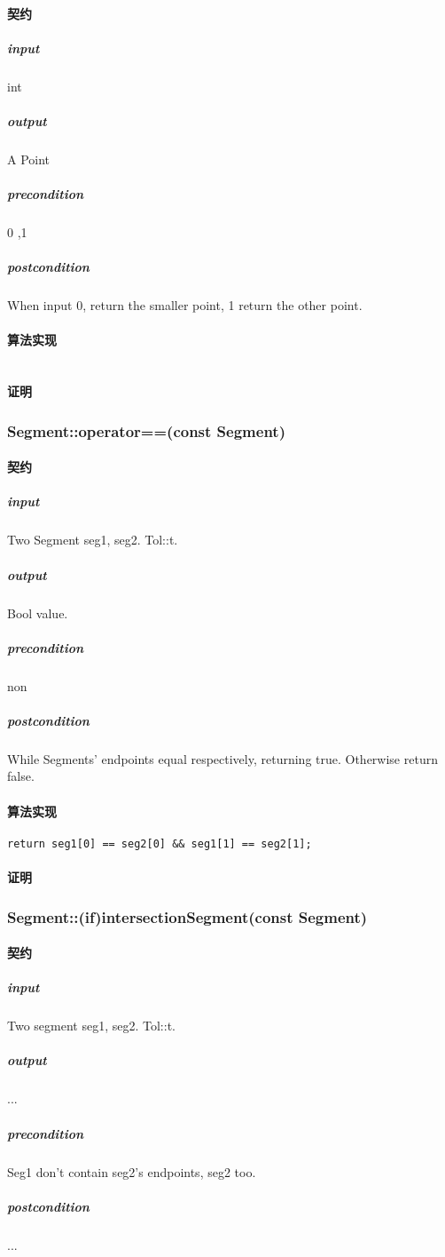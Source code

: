 \documentclass[a4paper]{book}
\numberwithin{equation}{chapter}
\theoremstyle{definition}
\begin{document}
\begin{multicols}{2}
\paragraph{契约}
\subparagraph{input}
int
\subparagraph{output}
A Point
\subparagraph{precondition}
0 ,1
\subparagraph{postcondition}
When input 0, return the smaller point, 1 return  the other point. 
\paragraph{算法实现}
\begin{lstlisting}

\end{lstlisting}
\paragraph{证明}

\subsubsection{Segment::operator==(const Segment)}
\paragraph{契约}
\subparagraph{input}
Two Segment seg1, seg2. Tol::t.
\subparagraph{output}
Bool value.
\subparagraph{precondition}
non
\subparagraph{postcondition}
While Segments' endpoints equal respectively, returning true. Otherwise return false.
\paragraph{算法实现}
\begin{lstlisting}
return seg1[0] == seg2[0] && seg1[1] == seg2[1];
\end{lstlisting}
\paragraph{证明}

\subsubsection{Segment::(if)intersectionSegment(const Segment)}
\paragraph{契约}
\subparagraph{input}
Two segment seg1, seg2. Tol::t.
\subparagraph{output}
...
\subparagraph{precondition}
Seg1 don't contain seg2's endpoints, seg2 too.
\subparagraph{postcondition}
...

\end{multicols}
\end{document}
